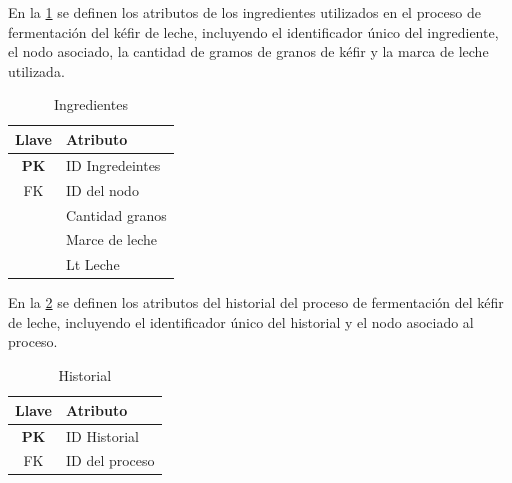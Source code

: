 En la \cref{tab:ingredientes} se definen los atributos de los ingredientes utilizados en el proceso de fermentación del kéfir de leche, 
incluyendo el identificador único del ingrediente, el nodo asociado, la cantidad de gramos de granos de kéfir y la marca de leche utilizada.

\begin{table}[H]
    \centering
    \caption{Ingredientes}%
    \label{tab:ingredientes}
    \footnotesize %

    \begin{tabular}{|c|>{\raggedright\arraybackslash}p{2.5cm}|}
        \hline
        \textbf{Llave}       & \textbf{Atributo}    \\ \hline
       \textbf{PK}  & ID Ingredeintes                                 \\ \hline
        FK  & ID del nodo                              \\ \hline 
        & Cantidad granos                                           \\ \hline
        & Marce de leche                                            \\ \hline
        & Lt Leche                                           \\ \hline
    \end{tabular}
\end{table}

En la \cref{tab:historial} se definen los atributos del historial del proceso de fermentación del kéfir de leche,
incluyendo el identificador único del historial y el nodo asociado al proceso.

\begin{table}[H]
    \centering
    \caption{Historial}%
    \label{tab:historial}
    \footnotesize %

    \begin{tabular}{|c|>{\raggedright\arraybackslash}p{2.5cm}|}
        \hline
        \textbf{Llave}       & \textbf{Atributo}    \\ \hline
       \textbf{PK}  & ID Historial                                \\ \hline
        FK  & ID del proceso                            \\ \hline 
    \end{tabular}
\end{table}

